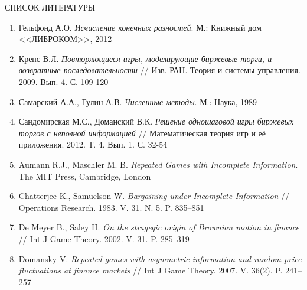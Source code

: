 \begin{center}
СПИСОК ЛИТЕРАТУРЫ
\end{center}

\begin{enumerate}
\item
Гельфонд А.О. \textit{Исчисление конечных разностей}. М.: Книжный дом <<ЛИБРОКОМ>>, 2012

\item
Крепс В.Л. \textit{Повторяющиеся игры, моделирующие биржевые торги, и возвратные последовательности} // Изв. РАН. Теория и системы управления. 2009. Вып. 4. С. 109-120

\item
Самарский А.А., Гулин А.В. \textit{Численные методы}. М.: Наука, 1989

\item
Сандомирская М.С., Доманский В.К. \textit{Решение одношаговой игры биржевых торгов с неполной информацией} // Математическая теория игр и её приложения. 2012. Т. 4. Вып. 1. С. 32-54 

\item
Aumann R.J., Maschler M. B. \textit{Repeated Games with Incomplete Information}. The MIT Press, Cambridge, London

\item
Chatterjee K., Samuelson W. \textit{Bargaining under Incomplete Information} // Operations Research. 1983. V. 31. N. 5. P. 835--851

\item
De Meyer B., Saley H. \textit{On the stragegic origin of Brownian motion in finance} // Int J Game Theory. 2002. V. 31. P. 285--319

\item
Domansky V. \textit{Repeated games with asymmetric information and random price fluctuations at finance markets} // Int J Game Theory. 2007. V. 36(2). P. 241--257
\end{enumerate}

\makeenginfo